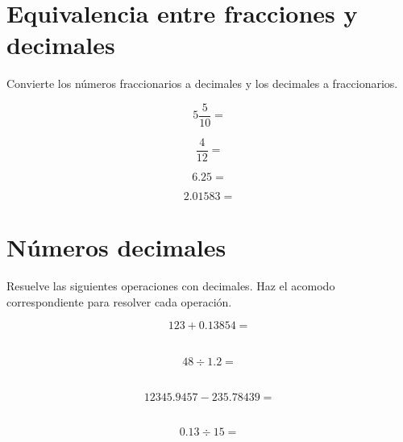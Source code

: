 \documentclass[11pt]{article}
\begin{document}
\section{Equivalencia entre fracciones y decimales}

Convierte los n\'umeros fraccionarios a decimales y los decimales a fraccionarios.
\setcounter{equation}{0}


\begin{multicols}{2}

\begin{equation}    5\frac{5}{10} = \end{equation}
\vspace{1cm}

\begin{equation}    \frac{4}{12} = \end{equation}
\vspace{1cm}

\begin{equation}    6.25 = \end{equation}
\vspace{1cm}

\begin{equation}    2.01583 = \end{equation}
\vspace{1cm}

\end{multicols}

\vspace{1cm}

\section{N\'umeros decimales}

Resuelve las siguientes operaciones con decimales. Haz el acomodo correspondiente para resolver cada operaci\'on.
\setcounter{equation}{0}

\begin{multicols}{2}

\begin{equation}    123 + 0.13854    =\end{equation}\\
\vspace{2.5cm}

\begin{equation} 48  \div    1.2     =\end{equation}\\
\vspace{2.5cm}

\begin{equation}    12345.9457 - 235.78439  =\end{equation}\\
\vspace{2.5cm}

\begin{equation} 0.13    \div    15  =\end{equation}\\
\vspace{2.5cm}

\end{multicols}
\end{document}
